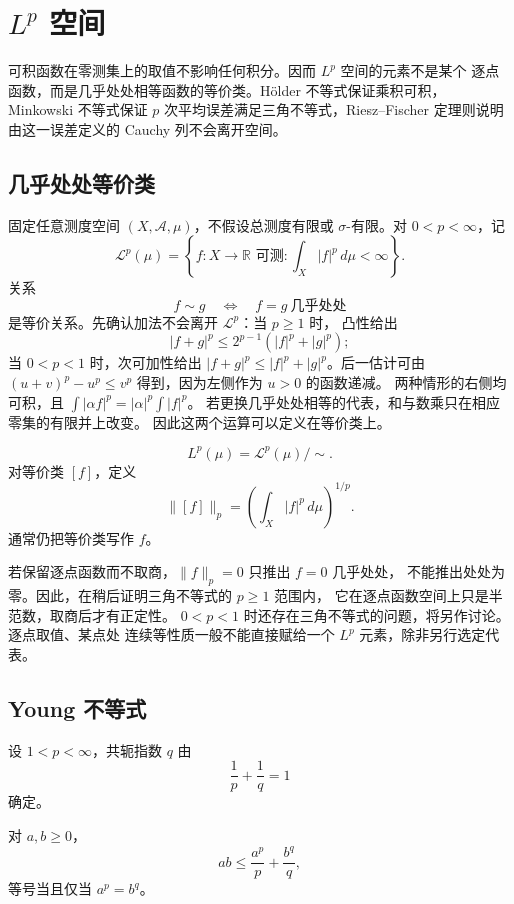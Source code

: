 \chapter{\texorpdfstring{\(L^p\)}{Lp} 空间}
\label{chap:lp-spaces}

可积函数在零测集上的取值不影响任何积分。因而 \(L^p\) 空间的元素不是某个
逐点函数，而是几乎处处相等函数的等价类。Hölder 不等式保证乘积可积，
Minkowski 不等式保证 \(p\) 次平均误差满足三角不等式，Riesz--Fischer
定理则说明由这一误差定义的 Cauchy 列不会离开空间。

\section{几乎处处等价类}

固定任意测度空间 \((X,\mathcal A,\mu)\)，不假设总测度有限或
\(\sigma\)-有限。对 \(0<p<\infty\)，记
\[
 \mathcal L^p(\mu)
 =\left\{f:X\to\mathbb R\text{ 可测}:
   \int_X|f|^p\,d\mu<\infty\right\}.
\]
关系
\[
 f\sim g\quad\Longleftrightarrow\quad f=g\ \text{几乎处处}
\]
是等价关系。先确认加法不会离开 \(\mathcal L^p\)：当 \(p\ge1\) 时，
凸性给出
\[
 |f+g|^p\le2^{p-1}(|f|^p+|g|^p);
\]
当 \(0<p<1\) 时，次可加性给出
\(|f+g|^p\le|f|^p+|g|^p\)。后一估计可由
\((u+v)^p-u^p\le v^p\) 得到，因为左侧作为 \(u>0\) 的函数递减。
两种情形的右侧均可积，且 \(\int|\alpha f|^p=|\alpha|^p\int|f|^p\)。
若更换几乎处处相等的代表，和与数乘只在相应零集的有限并上改变。
因此这两个运算可以定义在等价类上。

\begin{definition}
\[
 L^p(\mu)=\mathcal L^p(\mu)/{\sim}.
\]
对等价类 \([f]\)，定义
\[
 \|[f]\|_p=\left(\int_X|f|^p\,d\mu\right)^{1/p}.
\]
通常仍把等价类写作 \(f\)。
\end{definition}

若保留逐点函数而不取商，\(\|f\|_p=0\) 只推出 \(f=0\) 几乎处处，
不能推出处处为零。因此，在稍后证明三角不等式的 \(p\ge1\) 范围内，
它在逐点函数空间上只是半范数，取商后才有正定性。
\(0<p<1\) 时还存在三角不等式的问题，将另作讨论。逐点取值、某点处
连续等性质一般不能直接赋给一个 \(L^p\) 元素，除非另行选定代表。

\section{Young 不等式}

设 \(1<p<\infty\)，共轭指数 \(q\) 由
\[
 \frac1p+\frac1q=1
\]
确定。

\begin{lemma}[Young]
\label{lem:young}
对 \(a,b\ge0\)，
\[
 ab\le\frac{a^p}{p}+\frac{b^q}{q},
\]
等号当且仅当 \(a^p=b^q\)。
\end{lemma}

